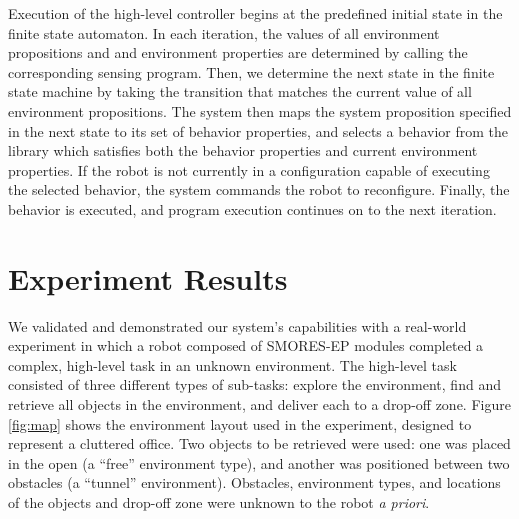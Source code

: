 \documentclass[conference]{IEEEtran}
\newcommand{\lt}{{\tt True }}
\begin{document}
Execution of the high-level controller begins at the predefined initial state in the finite state automaton. In each iteration, the values of all environment propositions and and environment properties are determined by calling the corresponding sensing program. Then, we determine the next state in the finite state machine by taking the transition that matches the current value of all environment propositions.
The system then maps the system proposition specified in the next state to its set of behavior properties, and selects a behavior from the library which satisfies both the behavior properties and current environment properties. If the robot is not currently in a configuration capable of executing the selected behavior, the system commands the robot to reconfigure. Finally, the behavior is executed, and program execution continues on to the next iteration. 


\section{Experiment Results}
\label{sec:experiments}
%

We validated and demonstrated our system's capabilities with a real-world experiment in which a robot composed of SMORES-EP modules completed a complex, high-level task in an unknown environment.  The high-level task consisted of three different types of sub-tasks: explore the environment, find and retrieve all objects in the environment, and deliver each to a drop-off zone. Figure \ref{fig:map} shows the environment layout used in the experiment, designed to represent a cluttered office. Two objects to be retrieved were used: one was placed in the open (a ``free'' environment type), and another was positioned between two obstacles (a ``tunnel'' environment). Obstacles, environment types, and locations of the objects and drop-off zone were unknown to the robot \textit{a priori}.
\end{document}
